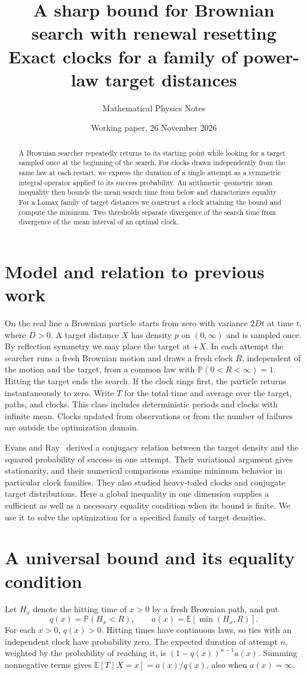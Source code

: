\documentclass[11pt]{article}
\title{A sharp bound for Brownian search with renewal resetting\\
\large Exact clocks for a family of power-law target distances}
\author{Mathematical Physics Notes}
\date{Working paper, 26 November 2026}
\newcommand{\E}{\mathbb{E}}
\newcommand{\Prob}{\mathbb{P}}
\begin{document}
\maketitle
\begin{abstract}
A Brownian searcher repeatedly returns to its starting point while looking
for a target sampled once at the beginning of the search. For clocks drawn
independently from the same law at each restart, we express the duration of a
single attempt as a symmetric integral operator applied to its success
probability. An arithmetic--geometric mean inequality then bounds the mean
search time from below and characterizes equality. For a Lomax family of
target distances we construct a clock attaining the bound and compute the
minimum. Two thresholds separate divergence of the search time from
divergence of the mean interval of an optimal clock.
\end{abstract}

\section{Model and relation to previous work}
On the real line a Brownian particle starts from zero with variance $2Dt$
at time $t$, where $D>0$. A target distance $X$ has density $p$ on
$(0,\infty)$ and is sampled once. By reflection symmetry we may place the
target at $+X$. In each attempt the searcher runs a fresh Brownian motion
and draws a fresh clock $R$, independent of the motion and the target, from
a common law with $\Prob(0<R<\infty)=1$. Hitting the target ends the search.
If the clock rings first, the particle returns instantaneously to zero.
Write $T$ for the total time and average over the target, paths, and clocks.
This class includes deterministic periods and clocks with infinite mean.
Clocks updated from observations or from the number of failures are outside
the optimization domain.

Evans and Ray~\cite{evansray} derived a conjugacy relation between the
target density and the squared probability of success in one attempt.
Their variational argument gives stationarity, and their numerical
comparisons examine minimum behavior in particular clock families. They
also studied heavy-tailed clocks and conjugate target distributions.
Here a global inequality in one dimension supplies a sufficient as well as
a necessary equality condition when its bound is finite. We use it to solve
the optimization for a specified family of target densities.

\section{A universal bound and its equality condition}
Let $H_x$ denote the hitting time of $x>0$ by a fresh Brownian path, and put
\[
 q(x)=\Prob(H_x<R),\qquad a(x)=\E[\min(H_x,R)].
\]
For each $x>0$, $q(x)>0$. Hitting times have continuous laws, so ties with
an independent clock have probability zero. The expected duration of attempt
$n$, weighted by the probability of reaching it, is $(1-q(x))^{n-1}a(x)$.
Summing nonnegative terms gives $\E[T\mid X=x]=a(x)/q(x)$, also when
$a(x)=\infty$.
\end{document}
